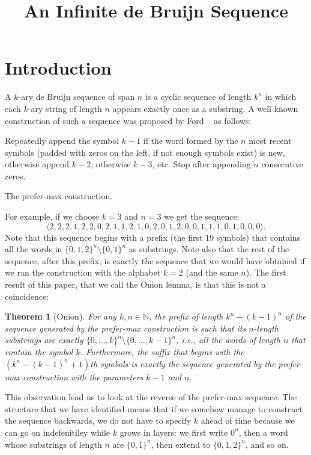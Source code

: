 \documentclass{article}
\title{An Infinite de Bruijn Sequence}
\author{}
\newtheorem{theorem}{Theorem}
\theoremstyle{definition}
\newcommand{\N}{{\mathbb{N}}}
\begin{document}
\maketitle

\section{Introduction}

A $k$-ary de Bruijn sequence of span $n$ is a cyclic sequence of length $k^n$ in which each $k$-ary string of length $n$ appears exactly once as
a substring. A well known construction of such a sequence was proposed by Ford ~\cite{Ford57} as follows:

\begin{algorithm}
Repeatedly append the symbol $k-1$ if the word formed by the $n$ most recent symbols (padded with zeros on the left, if not enough symbols exist) is new, otherwise append $k-2$, otherwise $k-3$, etc. Stop after appending $n$ consecutive zeros. 
\caption{The prefer-max construction.}
\end{algorithm}


For example, if we choose $k=3$ and $n=3$ we get the sequence:
$$\langle2,2,2,1,2,2,0,2,1,1,2,1,0,2,0,1,2,0,0,1,1,1,0,1,0,0,0\rangle.$$
Note that this sequence begins with a prefix (the first $19$ symbols) that contains all the words in $\{0,1,2\}^n \setminus \{0,1\}^n$ as substrings. Note also that the rest of the sequence, after this prefix, is exactly the sequence that we would have obtained if we ran the construction with the alphabet $k=2$ (and the same $n$). The first result of this paper, that we call the Onion lemma, is that this is not a coincidence:

\begin{theorem}[Onion]
	For any $k,n \in \N$, the prefix of length $k^n-(k-1)^n$ of the sequence generated by the prefer-max construction is such that its $n$-length substrings are exactly $\{0,\dots,k\}^n \setminus \{0,\dots,k-1\}^n$, i.e., all the words of length $n$ that contain the symbol $k$. Furthermore, the suffix that begins with the 
	$(k^n-(k-1)^n+1)$th symbols is exactly the sequence generated by the prefer-max construction with the parameters $k-1$ and $n$.
\end{theorem}

This observation lead us to look at the reverse of the prefer-max sequence. The structure that we have identified means that if we somehow manage to construct the sequence backwards, we do not have to specify $k$ ahead of time because we can go on indefenitiley while $k$ grows in layers: we first write $0^n$, then a word whose substrings of length $n$ are $\{0,1\}^n$, then extend to $\{0,1,2\}^n$, and so on.
\end{document}
